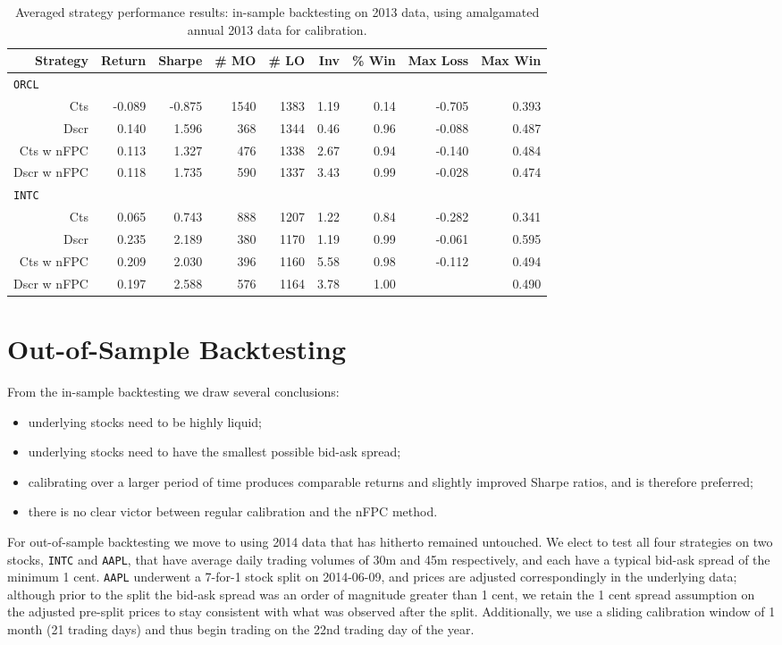 \begin{table}
\centering
{}
\begin{tabular}{@{} *{9}{r} @{}}
\toprule
Strategy & Return & Sharpe & \# MO & \# LO & Inv & \% Win & Max Loss & Max Win \\
\midrule
\multicolumn{9}{l}{\texttt{ORCL}} \\ 
Cts & -0.089 & -0.875 & 1540 & 1383 & 1.19 & 0.14 & -0.705 & 0.393 \\ 
Dscr & 0.140 & 1.596 & 368 & 1344 & 0.46 & 0.96 & -0.088 & 0.487 \\ 
Cts w nFPC & 0.113 & 1.327 & 476 & 1338 & 2.67 & 0.94 & -0.140 & 0.484 \\ 
Dscr w nFPC & 0.118 & 1.735 & 590 & 1337 & 3.43 & 0.99 & -0.028 & 0.474 \\[2ex]
\multicolumn{9}{l}{\texttt{INTC}} \\ 
Cts & 0.065 & 0.743 & 888 & 1207 & 1.22 & 0.84 & -0.282 & 0.341 \\ 
Dscr & 0.235 & 2.189 & 380 & 1170 & 1.19 & 0.99 & -0.061 & 0.595 \\ 
Cts w nFPC & 0.209 & 2.030 & 396 & 1160 & 5.58 & 0.98 & -0.112 & 0.494 \\ 
Dscr w nFPC & 0.197 & 2.588 & 576 & 1164 & 3.78 & 1.00 &  & 0.490 \\ 
\bottomrule
\end{tabular}
\caption{Averaged strategy performance results: in-sample backtesting on 2013 data, using amalgamated annual 2013 data for calibration.}
\label{tbl:IS_annual}
\end{table}

\FloatBarrier
\section{Out-of-Sample Backtesting}
From the in-sample backtesting we draw several conclusions:
\begin{itemize}
\item underlying stocks need to be highly liquid;
\item underlying stocks need to have the smallest possible bid-ask spread;
\item calibrating over a larger period of time produces comparable returns and slightly improved Sharpe ratios, and is therefore preferred;
\item there is no clear victor between regular calibration and the nFPC method.
\end{itemize}
For out-of-sample backtesting we move to using 2014 data that has hitherto remained untouched. We elect to test all four strategies on two stocks, \texttt{INTC} and \texttt{AAPL}, that have average daily trading volumes of 30m and 45m respectively, and each have a typical bid-ask spread of the minimum 1 cent. \texttt{AAPL} underwent a 7-for-1 stock split on 2014-06-09, and prices are adjusted correspondingly in the underlying data; although prior to the split the bid-ask spread was an order of magnitude greater than 1 cent, we retain the 1 cent spread assumption on the adjusted pre-split prices to stay consistent with what was observed after the split. Additionally, we use a sliding calibration window of 1 month (21 trading days) and thus begin trading on the 22nd trading day of the year. 


